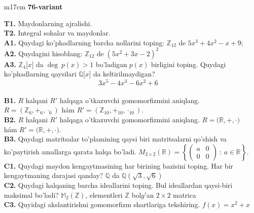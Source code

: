 \documentclass{article}
\begin{document}
\begin{tabular}{m{17cm}}
\textbf{76-variant}
\newline

\textbf{T1.} Maydonlarning ajralishi. \\
\textbf{T2.} Integral sohalar va maydonlar. \\
\textbf{A1.} Quydagi ko'phadlarning barcha nollarini toping:
\(\mathbb{Z}_{12}\) de \(5x^{3} + 4x^{2} - x + 9\); \\
\textbf{A2.} Quydagini hisoblang:
\(\mathbb{Z}_{12}\) de \(\left( 5x^{2} + 3x - 2 \right)^{2}\) \\
\textbf{A3.} \(\mathbb{Z}_{4}\lbrack x\rbrack\) da \(\deg\ p(x) > 1\) bo'ladigan \(p(x)\) birligini toping. Quydagi ko'phadlarning qaysilari \(\mathbb{Q\lbrack}x\rbrack\) da keltirilmaydigan?
\[3x^{5} - 4x^{3} - 6x^{2} + 6\] \\
\textbf{B1.} \(R\) halqani \(R'\) halqaga o'tkazuvchi gomomorfizmini aniqlang.
\(R = (\mathbb{Z}_{6}, +_{6}, \cdot_{6})\) hám \(R' = (\mathbb{Z}_{10}, +_{10}, \cdot_{10})\). \\
\textbf{B2.} \(R\) halqani \(R'\) halqaga o'tkazuvchi gomomorfizmini aniqlang.
\(R\mathbb{= (R,} + , \cdot )\) hám \(R'\mathbb{= (R,} + , \cdot )\). \\
\textbf{B3.} Quydagi matritsalar to'plamining qaysi biri matritsalarni qo'shish va ko'paytirish amallarga qarata halqa bo'ladi.
\(M_{2 \times 2}\mathbb{(R) =}\left\{ \begin{pmatrix}
a & 0 \\
0 & 0
\end{pmatrix}\ :\ a \in \mathbb{R} \right\}\). \\
\textbf{C1.} Quydagi maydon kengaytmasining har birining bazisini toping. Har bir kengaytmaning darajasi qanday?
\(\mathbb{Q}\) da \(\mathbb{Q}\left( \sqrt{3},\sqrt{6} \right)\) \\
\textbf{C2.} Quydagi halqaning barcha ideallarini toping. Bul ideallardan qaysi-biri maksimal bo'ladi?
\(\mathbb{M}_{2}\left( \mathbb{Z} \right)\), elementleri \(\mathbb{Z}\) bol\(g'\)an \(2 \times 2\) matrica \\
\textbf{C3.} Quyidagi akslantirishni gomomorfizm shartlariga tekshiring. \(f(x) = x^{2} + x\) \\

\end{tabular}
\vspace{1cm}
\end{document}
